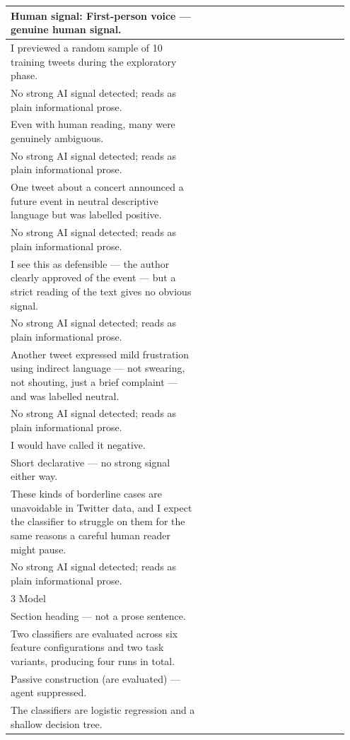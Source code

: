 \documentclass[11pt]{article}
\begin{document}
\begin{longtable}{|p{0.55\linewidth}|p{0.40\linewidth}|}
\hline
Human signal: First-person voice --- genuine human signal. & \\
\hline
I previewed a random sample of 10 training tweets during the exploratory phase. & \\[2pt]
\hline
No strong AI signal detected; reads as plain informational prose. & \\
\hline
Even with human reading, many were genuinely ambiguous. & \\[2pt]
\hline
No strong AI signal detected; reads as plain informational prose. & \\
\hline
One tweet about a concert announced a future event in neutral descriptive language but was labelled positive. & \\[2pt]
\hline
No strong AI signal detected; reads as plain informational prose. & \\
\hline
I see this as defensible --- the author clearly approved of the event --- but a strict reading of the text gives no obvious signal. & \\[2pt]
\hline
No strong AI signal detected; reads as plain informational prose. & \\
\hline
Another tweet expressed mild frustration using indirect language --- not swearing, not shouting, just a brief complaint --- and was labelled neutral. & \\[2pt]
\hline
No strong AI signal detected; reads as plain informational prose. & \\
\hline
I would have called it negative. & \\[2pt]
\hline
Short declarative --- no strong signal either way. & \\
\hline
These kinds of borderline cases are unavoidable in Twitter data, and I expect the classifier to struggle on them for the same reasons a careful human reader might pause. & \\[2pt]
\hline
No strong AI signal detected; reads as plain informational prose. & \\
\hline
3 Model & \\[2pt]
\hline
Section heading --- not a prose sentence. & \\
\hline
Two classifiers are evaluated across six feature configurations and two task variants, producing four runs in total. & \\[2pt]
\hline
Passive construction (are evaluated) --- agent suppressed. & \\
\hline
The classifiers are logistic regression and a shallow decision tree. & \\[2pt]

\end{longtable}
\end{document}
